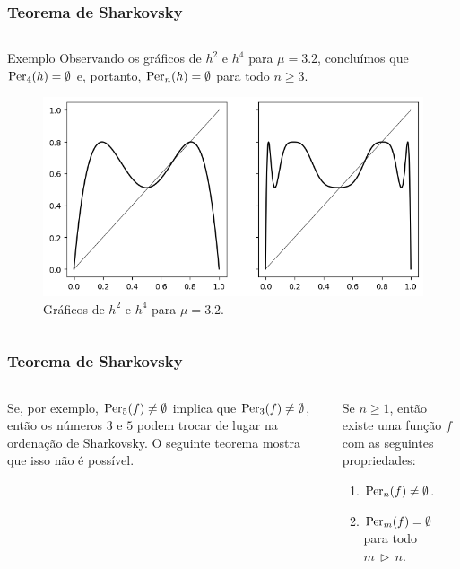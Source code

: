 \begin{frame}
\vspace{5pt}
\frametitle{Teorema de Sharkovsky}
\begin{columns}
\column{\dimexpr\paperwidth-15pt}

\begin{block}{Exemplo}
Observando os gráficos de $h^2$ e $h^4$ para $\mu = 3.2$, concluímos que $\operatorname{Per}_4(h) = \emptyset$ e, portanto, $\operatorname{Per}_n(h) = \emptyset$ para todo $n \geq 3$.

\vspace{5pt}

\begin{figure}[!htb]
\centering
\includegraphics[scale=0.4]{images/h_3,2.png}
\caption{Gráficos de $h^2$ e $h^4$ para $\mu = 3.2$.}
\end{figure}
\end{block}

\end{columns}
\end{frame}


\begin{frame}
\vspace{5pt}
\frametitle{Teorema de Sharkovsky}
\begin{columns}
\column{\dimexpr\paperwidth-15pt}

Se, por exemplo, $\operatorname{Per}_5(f) \neq \emptyset$ implica que $\operatorname{Per}_3(f) \neq \emptyset$, então os números $3$ e $5$ podem trocar de lugar na ordenação de Sharkovsky. O seguinte teorema mostra que isso não é possível.

\begin{theorem}
Se $n \geq 1$, então existe uma função $f$ com as seguintes propriedades:
\begin{enumerate}
\item $\operatorname{Per}_n(f) \neq \emptyset$.
\item $\operatorname{Per}_m(f) =  \emptyset$ para todo $m \, \triangleright \, n$.
\end{enumerate}
\end{theorem}

\end{columns}
\end{frame}
